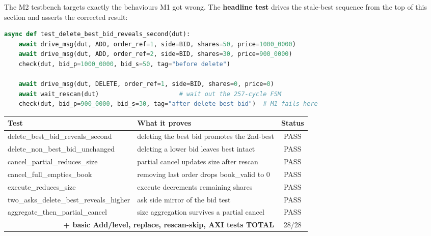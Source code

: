 \documentclass[11pt,a4paper]{article}
\begin{document}
The M2 testbench targets exactly the behaviours M1 got wrong. The
\textbf{headline test} drives the stale-best sequence from the top of this
section and asserts the corrected result:

\begin{lstlisting}[language=Python,
  caption={The test that proves M2 fixes the phantom quote}]
async def test_delete_best_bid_reveals_second(dut):
    await drive_msg(dut, ADD, order_ref=1, side=BID, shares=50, price=1000_0000)
    await drive_msg(dut, ADD, order_ref=2, side=BID, shares=30, price=900_0000)
    check(dut, bid_p=1000_0000, bid_s=50, tag="before delete")

    await drive_msg(dut, DELETE, order_ref=1, side=BID, shares=0, price=0)
    await wait_rescan(dut)                      # wait out the 257-cycle FSM
    check(dut, bid_p=900_0000, bid_s=30, tag="after delete best bid")  # M1 fails here
\end{lstlisting}

\begin{center}
\small
\begin{tabular}{l p{8.2cm} c}
\toprule
\textbf{Test} & \textbf{What it proves} & \textbf{Status} \\
\midrule
\rowcolor{fixgreen!12}
delete\_best\_bid\_reveals\_second & deleting the best bid promotes the 2nd-best & PASS \\
\rowcolor{fixgreen!12}
delete\_non\_best\_bid\_unchanged  & deleting a lower bid leaves best intact & PASS \\
\rowcolor{fixgreen!12}
cancel\_partial\_reduces\_size     & partial cancel updates size after rescan & PASS \\
\rowcolor{fixgreen!12}
cancel\_full\_empties\_book        & removing last order drops book\_valid to 0 & PASS \\
\rowcolor{fixgreen!12}
execute\_reduces\_size             & execute decrements remaining shares & PASS \\
\rowcolor{fixgreen!12}
two\_asks\_delete\_best\_reveals\_higher & ask side mirror of the bid test & PASS \\
\rowcolor{fixgreen!12}
aggregate\_then\_partial\_cancel   & size aggregation survives a partial cancel & PASS \\
\midrule
\multicolumn{2}{r}{\bfseries + basic Add/level, replace, rescan-skip, AXI tests \quad TOTAL} & 28/28 \\
\bottomrule
\end{tabular}
\end{center}
\end{document}
